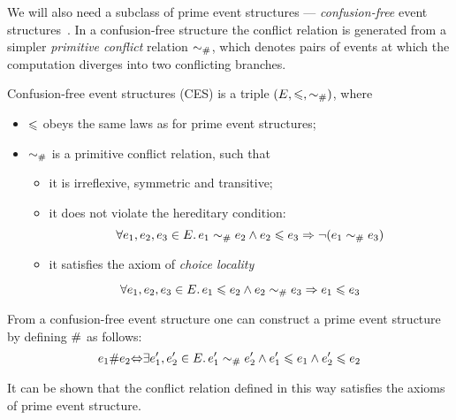 We will also need a subclass of prime event structures --- 
\emph{confusion-free} event structures~\cite{Nielsen-al:1981}. 
In a confusion-free structure the conflict relation is generated from 
a simpler \emph{primitive conflict} relation $\sim_{\#}$,
which denotes pairs of events at which the computation
diverges into two conflicting branches. 

\begin{definition}
Confusion-free event structures (CES) is a triple $(E, \leqslant, \sim_{\#})$, where
\begin{itemize}
  \item $\leqslant$ obeys the same laws as for prime event structures;
  \item $\sim_{\#}$ is a primitive conflict relation, such that
  \begin{itemize}
    \item it is irreflexive, symmetric and transitive;
    \item it does not violate the hereditary condition:
    $$ \forall e_1, e_2, e_3 \in E \ldotp 
       e_1 \sim_{\#} e_2 \land e_2 \leqslant e_3 \Rightarrow \neg (e_1 \sim_{\#} e_3) $$
    \item it satisfies the axiom of \emph{choice locality}
  \end{itemize}
    $$ \forall e_1, e_2, e_3 \in E \ldotp e_1 \leqslant e_2 \land e_2 \sim_{\#} e_3 \Rightarrow e_1 \leqslant e_3 $$
\end{itemize}
\end{definition}

From a confusion-free event structure one can construct a prime event structure
by defining $\#$ as follows:
$$ e_1 \# e_2 {\Leftrightarrow} 
   \exists e'_1, e'_2 \in E \ldotp e'_1 \sim_{\#} e'_2 \land
   e'_1 \leqslant e_1 \land e'_2 \leqslant e_2 $$

It can be shown that the conflict relation defined in this way 
satisfies the axioms of prime event structure.






